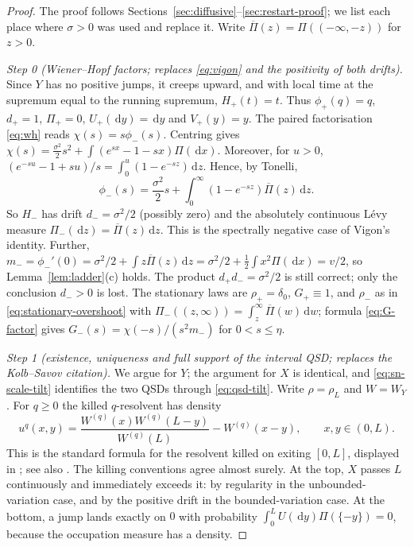 \documentclass[11pt,a4paper]{article}
\theoremstyle{definition}
\theoremstyle{remark}
\newcommand{\1}{\mathbf 1}
\newcommand{\dd}{\,\mathrm d}
\begin{document}
\begin{proof}
The proof follows Sections~\ref{sec:diffusive}--\ref{sec:restart-proof}; we list each place where $\sigma>0$ was used and replace it. Write $\overline\Pi(z)=\Pi((-\infty,-z))$ for $z>0$.

\emph{Step 0 (Wiener--Hopf factors; replaces \eqref{eq:vigon} and the positivity of both drifts).}
Since $Y$ has no positive jumps, it creeps upward, and with local time at the supremum equal to the running supremum, $H_+(t)=t$. Thus $\phi_+(q)=q$, $d_+=1$, $\Pi_+=0$, $U_+(\dd y)=\dd y$ and $V_+(y)=y$. The paired factorisation \eqref{eq:wh} reads $\chi(s)=s\phi_-(s)$. Centring gives $\chi(s)=\tfrac{\sigma^2}2s^2+\int(e^{sx}-1-sx)\Pi(\dd x)$. Moreover, for $u>0$,
$(e^{-su}-1+su)/s=\int_0^u(1-e^{-sz})\dd z$. Hence, by Tonelli,
\[
 \phi_-(s)=\frac{\sigma^2}2s+\int_0^\infty(1-e^{-sz})\overline\Pi(z)\dd z .
\]
So $H_-$ has drift $d_-=\sigma^2/2$ (possibly zero) and the absolutely continuous L\'evy measure $\Pi_-(\dd z)=\overline\Pi(z)\dd z$. This is the spectrally negative case of Vigon's identity. Further, $m_-=\phi_-'(0)=\sigma^2/2+\int z\overline\Pi(z)\dd z=\sigma^2/2+\tfrac12\int x^2\Pi(\dd x)=v/2$, so Lemma~\ref{lem:ladder}(c) holds. The product $d_+d_-=\sigma^2/2$ is still correct; only the conclusion $d_->0$ is lost. The stationary laws are $\rho_+=\delta_0$, $G_+\equiv1$, and $\rho_-$ as in \eqref{eq:stationary-overshoot} with $\Pi_-((z,\infty))=\int_z^\infty\overline\Pi(w)\dd w$; formula \eqref{eq:G-factor} gives $G_-(s)=\chi(-s)/(s^2m_-)$ for $0<s\le\eta$.

\emph{Step 1 (existence, uniqueness and full support of the interval QSD; replaces the Kolb--Savov citation).}
We argue for $Y$; the argument for $X$ is identical, and \eqref{eq:sn-scale-tilt} identifies the two QSDs through \eqref{eq:qsd-tilt}. Write $\rho=\rho_L$ and $W=W_Y$. For $q\ge0$ the killed $q$-resolvent has density
\begin{equation}\label{eq:sn-resolvent}
 u^q(x,y)=\frac{W^{(q)}(x)W^{(q)}(L-y)}{W^{(q)}(L)}-W^{(q)}(x-y),\qquad x,y\in(0,L).
\end{equation}
This is the standard formula for the resolvent killed on exiting $[0,L]$, displayed in \cite[eq.~(6)]{lambert}; see also \cite[Ch.~8]{kyprianoubook}. The killing conventions agree almost surely. At the top, $X$ passes $L$ continuously and immediately exceeds it: by regularity in the unbounded-variation case, and by the positive drift in the bounded-variation case. At the bottom, a jump lands exactly on $0$ with probability $\int_0^LU(\dd y)\Pi(\{-y\})=0$, because the occupation measure has a density.


\end{proof}
\end{document}
